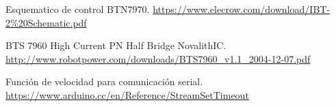 \documentclass[twoside,22pt]{Latex/Classes/thesisUMSNH}
\begin{document}
\begin{thebibliography}{2}
Esquematico de control BTN7970. \url{https://www.elecrow.com/download/IBT-2\%20Schematic.pdf}

BTS 7960 High Current PN Half Bridge NovalithIC. \url{http://www.robotpower.com/downloads/BTS7960_v1.1_2004-12-07.pdf}

Función de velocidad para comunicación serial. \url{https://www.arduino.cc/en/Reference/StreamSetTimeout}







\end{thebibliography}
\end{document}
